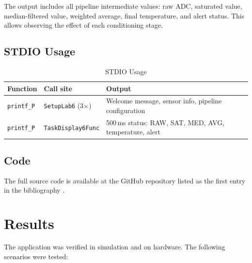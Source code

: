 \documentclass[12pt]{article}
\begin{document}
The output includes all pipeline intermediate values: raw ADC, saturated value, median-filtered value, weighted average, final temperature, and alert status. This allows observing the effect of each conditioning stage.

\subsection{STDIO Usage}

\begin{table}[H]
\centering
\begin{tabular}{@{}lp{4cm}p{5.5cm}@{}}
\toprule
\textbf{Function} & \textbf{Call site} & \textbf{Output} \\
\midrule
\texttt{printf\_P}
  & \texttt{SetupLab6} (3$\times$)
  & Welcome message, sensor info, pipeline configuration \\
\texttt{printf\_P}
  & \texttt{TaskDisplay6Func}
  & 500\,ms status: RAW, SAT, MED, AVG, temperature, alert \\
\bottomrule
\end{tabular}
\caption{STDIO Usage}
\label{tab:stdio}
\end{table}

\subsection{Code}

The full source code is available at the GitHub repository listed as the first entry in the bibliography \cite{code}.

\section{Results}

The application was verified in simulation and on hardware. The following scenarios were tested:
\end{document}
